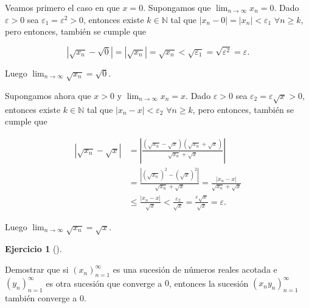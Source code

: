 \documentclass[
  spanish,
  a4paper,
]{scrreport}
\theoremstyle{definition}
\newtheorem{exercise}{Ejercicio}[chapter]
\theoremstyle{remark}
\begin{document}
\begin{tcolorbox}[enhanced jigsaw, arc=.35mm, bottomrule=.15mm, bottomtitle=1mm, breakable, colback=white, colbacktitle=quarto-callout-tip-color!10!white, colframe=quarto-callout-tip-color-frame, coltitle=black, left=2mm, leftrule=.75mm, opacityback=0, opacitybacktitle=0.6, rightrule=.15mm, title=\textcolor{quarto-callout-tip-color}{\faLightbulb}\hspace{0.5em}{Solución}, titlerule=0mm, toprule=.15mm, toptitle=1mm]

Veamos primero el caso en que \(x=0\). Supongamos que
\(\lim_{n\to\infty}x_n=0\). Dado \(\varepsilon>0\) sea
\(\varepsilon_1=\varepsilon^2>0\), entonces existe \(k\in\mathbb{N}\)
tal que \(|x_n-0|=|x_n|<\varepsilon_1\) \(\forall n\geq k\), pero
entonces, también se cumple que

\[
|\sqrt{x_n}-\sqrt{0}| = |\sqrt{x_n}| = \sqrt{x_n} < \sqrt{\varepsilon_1}=\sqrt{\varepsilon^2}=\varepsilon.
\]

Luego \(\lim_{n\to\infty}\sqrt{x_n}=\sqrt{0}\).

Supongamos ahora que \(x>0\) y \(\lim_{n\to\infty}x_n=x\). Dado
\(\varepsilon>0\) sea \(\varepsilon_2=\varepsilon\sqrt{x}>0\), entonces
existe \(k\in\mathbb{N}\) tal que \(|x_n-x|<\varepsilon_2\)
\(\forall n\geq k\), pero entonces, también se cumple que

\begin{align*}
|\sqrt{x_n}-\sqrt{x}| &= \left|\frac{(\sqrt{x_n}-\sqrt{x})(\sqrt{x_n}+\sqrt{x})}{\sqrt{x_n}+\sqrt{x}} \right|\\ 
&= \frac{|(\sqrt{x_n})^2-(\sqrt{x})^2|}{\sqrt{x_n}+\sqrt{x}} = \frac{|x_n-x|}{\sqrt{x_n}+\sqrt{x}} \\ 
&\leq \frac{|x_n-x|}{\sqrt{x}} <\frac{\varepsilon_2}{\sqrt{x}} = \frac{\varepsilon\sqrt{x}}{\sqrt{x}} = \varepsilon. 
\end{align*}

Luego \(\lim_{n\to\infty}\sqrt{x_n} = \sqrt{x}\).

\end{tcolorbox}

\begin{exercise}[]\protect\hypertarget{exr-producto-sucesion-convergente-0}{}\label{exr-producto-sucesion-convergente-0}

Demostrar que si \((x_n)_{n=1}^\infty\) es una sucesión de números
reales acotada e \((y_n)_{n=1}^\infty\) es otra sucesión que converge a
\(0\), entonces la sucesión \((x_ny_n)_{n=1}^\infty\) también converge a
\(0\).

\end{exercise}
\end{document}
